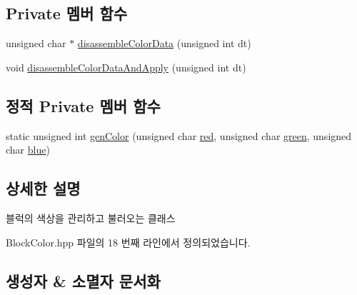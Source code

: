 \subsection*{Private 멤버 함수}
\begin{DoxyCompactItemize}
\item 
unsigned char $\ast$ \hyperlink{class_tetris_1_1_block_sub_modules_1_1_block_color_a216ddc10773f9d0dc44eca5b8b3d8336}{disassemble\+Color\+Data} (unsigned int dt)
\item 
void \hyperlink{class_tetris_1_1_block_sub_modules_1_1_block_color_afc3bb979353c91cf992101ed2dde610f}{disassemble\+Color\+Data\+And\+Apply} (unsigned int dt)
\end{DoxyCompactItemize}
\subsection*{정적 Private 멤버 함수}
\begin{DoxyCompactItemize}
\item 
static unsigned int \hyperlink{class_tetris_1_1_block_sub_modules_1_1_block_color_a479cf23117afea6237a4fd69bc4652ba}{gen\+Color} (unsigned char \hyperlink{class_tetris_1_1_block_sub_modules_1_1_block_color_af8a0dc372e7dbab300290eadada8ef49}{red}, unsigned char \hyperlink{class_tetris_1_1_block_sub_modules_1_1_block_color_a4b28885bfd8bf53793c6b3daedd974eb}{green}, unsigned char \hyperlink{class_tetris_1_1_block_sub_modules_1_1_block_color_af04e78b9a1c2f7625863c289c4a741e3}{blue})
\end{DoxyCompactItemize}


\subsection{상세한 설명}
블럭의 색상을 관리하고 불러오는 클래스 

Block\+Color.\+hpp 파일의 18 번째 라인에서 정의되었습니다.



\subsection{생성자 \& 소멸자 문서화}
\mbox{\label{class_tetris_1_1_block_sub_modules_1_1_block_color_abb929df07c6b378e31d76b7298eb9e12}} 
